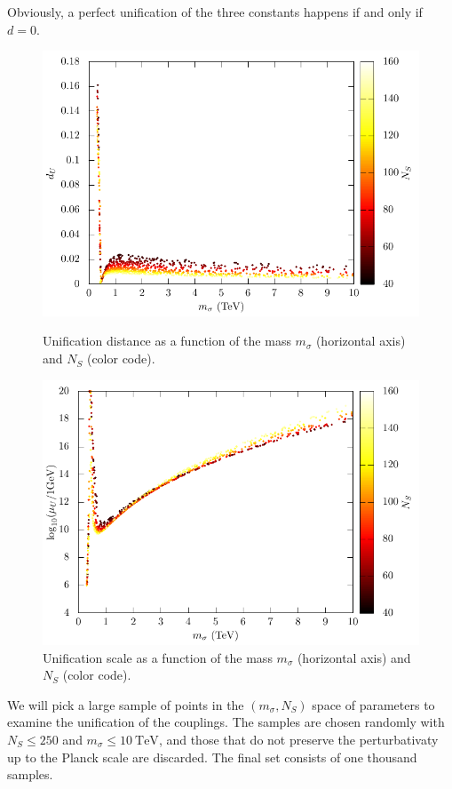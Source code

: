 \documentclass[aps,prd,preprintnumbers,nofootinbibn,twocolumn]{revtex4}
\begin{document}
Obviously, a perfect unification of the three constants happens if and only if $d=0$.
\begin{figure}[t]
\centering
\begin{minipage}[b]{0.49\textwidth}
\includegraphics[width=\columnwidth]{GUTdistance}
\caption{Unification distance as a function of the mass $m_\sigma$ (horizontal axis) and $N_S$ (color code).}\label{fig:GUTdistance}
\end{minipage}
\hfill
\begin{minipage}[b]{0.49\textwidth}
\includegraphics[width=\columnwidth]{GUTscale}
\caption{Unification scale as a function of the mass $m_\sigma$ (horizontal axis) and $N_S$ (color code).}\label{fig:GUTscale}
\end{minipage}
\end{figure}
We will pick a large sample of points in the $(m_\sigma, N_S)$ space of parameters to examine the unification of the couplings. The samples are chosen randomly with $N_S \leq 250$ and $m_\sigma \leq \SI{10}{\tera\electronvolt}$, and those that do not preserve the perturbativaty up to the Planck scale are discarded. The final set consists of one thousand samples.
\end{document}
